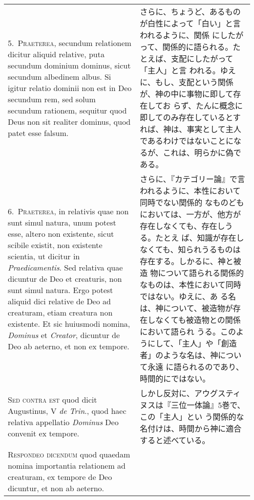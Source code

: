 \documentclass[10pt]{jsarticle} %
\begin{document}
\begin{longtable}{p{21em}p{21em}}
5.~{\scshape Praeterea}, secundum relationem dicitur aliquid relative,
puta secundum dominium dominus, sicut secundum albedinem albus. Si
igitur relatio dominii non est in Deo secundum rem, sed solum secundum
rationem, sequitur quod Deus non sit realiter dominus, quod patet esse
falsum.

&

さらに、ちょうど、あるものが白性によって「白い」と言われるように、関係
にしたがって、関係的に語られる。たとえば、支配にしたがって「主人」と言
われる。ゆえに、もし、支配という関係が、神の中に事物に即して存在してお
らず、たんに概念に即してのみ存在しているとすれば、神は、事実として主人
であるわけではないことになるが、これは、明らかに偽である。


\\



6.~{\scshape Praeterea}, in relativis quae non sunt simul natura, unum
potest esse, altero non existente, sicut scibile existit, non
existente scientia, ut dicitur in {\itshape Praedicamentis}. Sed
relativa quae dicuntur de Deo et creaturis, non sunt simul
natura. Ergo potest aliquid dici relative de Deo ad creaturam, etiam
creatura non existente. Et sic huiusmodi nomina, {\itshape Dominus} et
{\itshape Creator}, dicuntur de Deo ab aeterno, et non ex tempore.


&

さらに、『カテゴリー論』で言われるように、本性において同時でない関係的
なものどもにおいては、一方が、他方が存在しなくても、存在しうる。たとえ
ば、知識が存在しなくても、知られうるものは存在する。しかるに、神と被造
物について語られる関係的なものは、本性において同時ではない。ゆえに、あ
る名は、神について、被造物が存在しなくても被造物との関係において語られ
うる。このようにして、「主人」や「創造者」のような名は、神について永遠
に語られるのであり、時間的にではない。

\\


{\scshape Sed contra est} quod dicit Augustinus, V {\itshape de
Trin}., quod haec relativa appellatio {\itshape Dominus} Deo convenit
ex tempore.

&

しかし反対に、アウグスティヌスは『三位一体論』5巻で、この「主人」とい
う関係的な名付けは、時間から神に適合すると述べている。

\\


{\scshape Respondeo dicendum} quod quaedam nomina importantia
relationem ad creaturam, ex tempore de Deo dicuntur, et non ab
aeterno.


\end{longtable}
\end{document}
